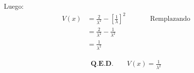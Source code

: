 \documentclass{templateNote}
\begin{document}
Luego:
\begin{align*}
    V(x) &= \frac{2}{\lambda^2} - \left[\frac{1}{\lambda}\right]^2 && \qquad \text{Remplazando}\\
    &= \frac{2}{\lambda^2} - \frac{1}{\lambda^2} \\
    &= \frac{1}{\lambda^2}
\end{align*}

\begin{align*}
    \textbf{Q.E.D.} \qquad V(x) = \displaystyle \frac{1}{\lambda^2}
\end{align*}
\end{document}
